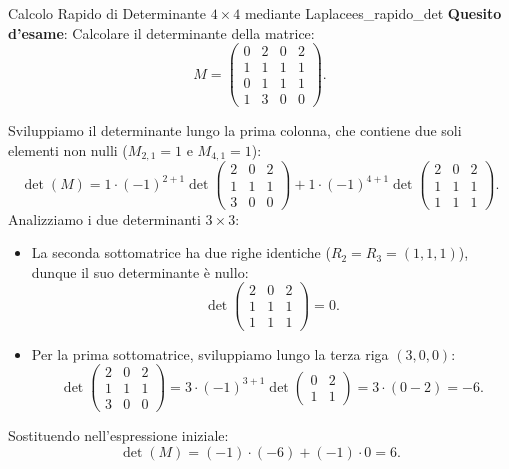 \begin{esempio}{Calcolo Rapido di Determinante $4 \times 4$ mediante Laplace}{es_rapido_det}
\textbf{Quesito d'esame}: Calcolare il determinante della matrice:
\begin{equation}
    M = \begin{pmatrix}
        0 & 2 & 0 & 2 \\
        1 & 1 & 1 & 1 \\
        0 & 1 & 1 & 1 \\
        1 & 3 & 0 & 0
    \end{pmatrix}.
\end{equation}

\begin{dimostrazione}[Risoluzione]
Sviluppiamo il determinante lungo la prima colonna, che contiene due soli elementi non nulli ($M_{2,1} = 1$ e $M_{4,1} = 1$):
\begin{equation}
    \det(M) = 1 \cdot (-1)^{2+1} \det \begin{pmatrix} 2 & 0 & 2 \\ 1 & 1 & 1 \\ 3 & 0 & 0 \end{pmatrix} + 1 \cdot (-1)^{4+1} \det \begin{pmatrix} 2 & 0 & 2 \\ 1 & 1 & 1 \\ 1 & 1 & 1 \end{pmatrix}.
\end{equation}
Analizziamo i due determinanti $3 \times 3$:
\begin{itemize}
    \item La seconda sottomatrice ha due righe identiche ($R_2 = R_3 = (1, 1, 1)$), dunque il suo determinante è nullo:
    \begin{equation}
        \det \begin{pmatrix} 2 & 0 & 2 \\ 1 & 1 & 1 \\ 1 & 1 & 1 \end{pmatrix} = 0.
    \end{equation}
    \item Per la prima sottomatrice, sviluppiamo lungo la terza riga $(3, 0, 0)$:
    \begin{equation}
        \det \begin{pmatrix} 2 & 0 & 2 \\ 1 & 1 & 1 \\ 3 & 0 & 0 \end{pmatrix} = 3 \cdot (-1)^{3+1} \det \begin{pmatrix} 0 & 2 \\ 1 & 1 \end{pmatrix} = 3 \cdot (0 - 2) = -6.
    \end{equation}
\end{itemize}
Sostituendo nell'espressione iniziale:
\begin{equation}
    \det(M) = (-1) \cdot (-6) + (-1) \cdot 0 = 6.
\end{equation}
\end{dimostrazione}
\end{esempio}

